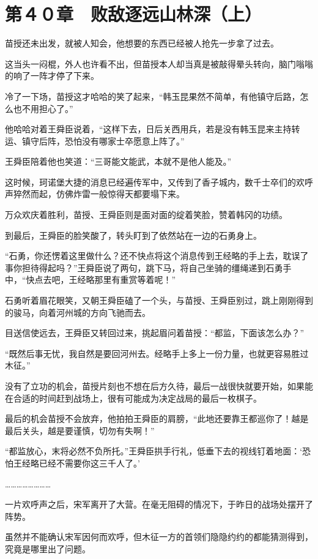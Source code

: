 \section{第４０章　败敌逐远山林深（上）}

苗授还未出发，就被人知会，他想要的东西已经被人抢先一步拿了过去。

这当头一闷棍，外人也许看不出，但苗授本人却当真是被敲得晕头转向，脑门嗡嗡的响了一阵才停了下来。

冷了一下场，苗授这才哈哈的笑了起来，“韩玉昆果然不简单，有他镇守后路，怎么也不用担心了。”

他哈哈对着王舜臣说着，“这样下去，日后关西用兵，若是没有韩玉昆来主持转运、镇守后阵，恐怕没有哪家士卒愿意上阵了。”

王舜臣陪着他也笑道：“三哥能文能武，本就不是他人能及。”

这时候，珂诺堡大捷的消息已经遍传军中，又传到了香子城内，数千士卒们的欢呼声猝然而起，仿佛炸雷一般惊得天都要塌下来。

万众欢庆着胜利，苗授、王舜臣则是面对面的绽着笑脸，赞着韩冈的功绩。

到最后，王舜臣的脸笑酸了，转头盯到了依然站在一边的石勇身上。

“石勇，你还愣着这里做什么？还不快点将这个消息传到王经略的手上去，耽误了事你担待得起吗？”王舜臣说了两句，跳下马，将自己坐骑的缰绳递到石勇手中，“快点去吧，王经略那里有重赏等着呢！”

石勇听着眉花眼笑，又朝王舜臣磕了一个头，与苗授、王舜臣别过，跳上刚刚得到的骏马，向着河州城的方向飞驰而去。

目送信使远去，王舜臣又转回过来，挑起眉问着苗授：“都监，下面该怎么办？”

“既然后事无忧，我自然是要回河州去。经略手上多上一份力量，也就更容易胜过木征。”

没有了立功的机会，苗授片刻也不想在后方久待，最后一战很快就要开始，如果能在合适的时间赶到战场上，很有可能成为决定战局的最后一枚棋子。

最后的机会苗授不会放弃，他拍拍王舜臣的肩膀，“此地还要靠王都巡你了！越是最后关头，越是要谨慎，切勿有失啊！”

“都监放心，末将必然不负所托。”王舜臣拱手行礼，低垂下去的视线钉着地面：‘恐怕王经略已经不需要你这三千人了。’

……………………

一片欢呼声之后，宋军离开了大营。在毫无阻碍的情况下，于昨日的战场处摆开了阵势。

虽然并不能确认宋军因何而欢呼，但木征一方的首领们隐隐约约的都能猜测得到，究竟是哪里出了问题。

